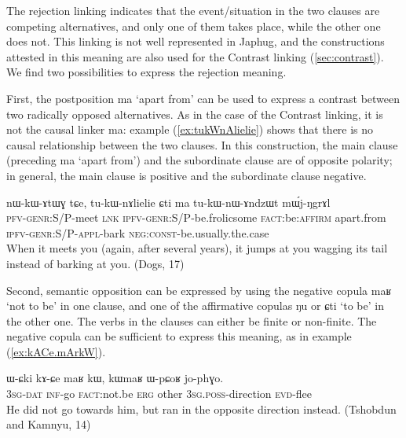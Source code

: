\documentclass[oldfontcommands,oneside,a4paper,11pt]{article}
\newcommand{\ipa}[1]{{\phon \mbox{#1}}} %
\newcommand{\refb}[1]{(\ref{#1})}
\begin{document}
The rejection linking indicates that the event/situation in the two clauses are competing alternatives, and only one of them takes place, while the other one  does not. This linking is not well represented in Japhug, and the constructions attested in this meaning are also used for the Contrast linking \refb{sec:contrast}. We find two possibilities to express the rejection meaning.

First, the postposition \ipa{ma} `apart from'  can be used to express a contrast between two radically opposed alternatives.  As in the case of the Contrast linking, it is not the causal linker \ipa{ma}: example \refb{ex:tukWnAlielie} shows that there is no causal relationship between the two clauses. In this construction, the main clause (preceding  \ipa{ma} `apart from') and the subordinate clause are of opposite polarity; in general, the main clause is positive and the subordinate clause negative.



\begin{exe}
\ex \label{ex:tukWnAlielie}
\gll
\ipa{nɯ-kɯ-ɤtɯɣ}  	\ipa{tɕe,}  	\ipa{tu-kɯ-nɤlielie}  	\ipa{ɕti}  	\ipa{ma}  	\ipa{tu-kɯ-nɯ-ɤndzɯt}  	\ipa{mɯ́j-ŋgrɤl}  	\\
\textsc{pfv-genr:S/P}-meet \textsc{lnk} \textsc{ipfv-genr:S/P}-be.frolicsome \textsc{fact}:be:\textsc{affirm}  apart.from \textsc{ipfv-genr:S/P}-\textsc{appl}-bark \textsc{neg:const}-be.usually.the.case \\
\glt When it meets you (again, after several years), it jumps at you wagging its tail instead of barking at you.  (Dogs, 17)
\end{exe}
 
Second, semantic opposition can be expressed by using the negative copula \ipa{maʁ} `not to be' in one clause, and one of the affirmative copulas \ipa{ŋu} or \ipa{ɕti} `to be' in the other one. The verbs in the clauses can either be finite or non-finite. The negative copula can be sufficient to express this meaning, as in example \refb{ex:kACe.mArkW}.

\begin{exe}
\ex \label{ex:kACe.mArkW}
\gll
\ipa{ɯ-ɕki}  	\ipa{kɤ-ɕe}  	\ipa{maʁ}  	\ipa{kɯ,}  	\ipa{kɯmaʁ}  	\ipa{ɯ-pɕoʁ}  	\ipa{jo-phɣo.}  \\
\textsc{3sg-dat} \textsc{inf}-go \textsc{fact}:not.be \textsc{erg} other \textsc{3sg.poss}-direction \textsc{evd}-flee \\
 \glt He did not go towards him, but ran in the opposite direction instead. (Tshobdun and Kamnyu, 14)
\end{exe}
 
\end{document}
